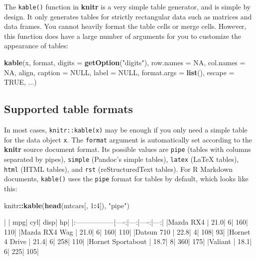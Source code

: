 \documentclass[
  11pt,
]{krantz}
\newenvironment{Shaded}{\begin{snugshade}}{\end{snugshade}}
\newcommand{\DataTypeTok}[1]{\textcolor[rgb]{0.27,0.27,0.27}{#1}}
\newcommand{\DecValTok}[1]{\textcolor[rgb]{0.06,0.06,0.06}{#1}}
\newcommand{\KeywordTok}[1]{\textcolor[rgb]{0.27,0.27,0.27}{\textbf{#1}}}
\newcommand{\NormalTok}[1]{#1}
\newcommand{\OperatorTok}[1]{\textcolor[rgb]{0.43,0.43,0.43}{\textbf{#1}}}
\newcommand{\OtherTok}[1]{\textcolor[rgb]{0.37,0.37,0.37}{#1}}
\newcommand{\StringTok}[1]{\textcolor[rgb]{0.5,0.5,0.5}{#1}}
\begin{document}
The \texttt{kable()} function in \textbf{knitr} is a very simple table generator, and is simple by design. It only generates tables for strictly rectangular data such as matrices and data frames. You cannot heavily format the table cells or merge cells. However, this function does have a large number of arguments for you to customize the appearance of tables:

\begin{Shaded}
\begin{Highlighting}[]
\KeywordTok{kable}\NormalTok{(x, format, }\DataTypeTok{digits =} \KeywordTok{getOption}\NormalTok{(}\StringTok{"digits"}\NormalTok{), }\DataTypeTok{row.names =} \OtherTok{NA}\NormalTok{, }\DataTypeTok{col.names =} \OtherTok{NA}\NormalTok{, align, }\DataTypeTok{caption =} \OtherTok{NULL}\NormalTok{, }\DataTypeTok{label =} \OtherTok{NULL}\NormalTok{, }
  \DataTypeTok{format.args =} \KeywordTok{list}\NormalTok{(), }\DataTypeTok{escape =} \OtherTok{TRUE}\NormalTok{, ...)}
\end{Highlighting}
\end{Shaded}

\hypertarget{kable-formats}{%
\subsection{Supported table formats}\label{kable-formats}}

In most cases, \texttt{knitr::kable(x)} may be enough if you only need a simple table for the data object \texttt{x}. The \texttt{format} argument is automatically set according to the \textbf{knitr} source document format. Its possible values are \texttt{pipe} (tables with columns separated by pipes), \texttt{simple} (Pandoc's simple tables), \texttt{latex} (LaTeX tables), \texttt{html} (HTML tables), and \texttt{rst} (reStructuredText tables). For R Markdown documents, \texttt{kable()} uses the \texttt{pipe} format for tables by default, which looks like this:

\begin{Shaded}
\begin{Highlighting}[]
\NormalTok{knitr}\OperatorTok{::}\KeywordTok{kable}\NormalTok{(}\KeywordTok{head}\NormalTok{(mtcars[, }\DecValTok{1}\OperatorTok{:}\DecValTok{4}\NormalTok{]), }\StringTok{"pipe"}\NormalTok{)}
\end{Highlighting}
\end{Shaded}

\begin{Shaded}
\begin{Highlighting}[]
\NormalTok{|                  |  mpg| cyl| disp|  hp|}
\NormalTok{|:-----------------|----:|---:|----:|---:|}
\NormalTok{|Mazda RX4         | 21.0|   6|  160| 110|}
\NormalTok{|Mazda RX4 Wag     | 21.0|   6|  160| 110|}
\NormalTok{|Datsun 710        | 22.8|   4|  108|  93|}
\NormalTok{|Hornet 4 Drive    | 21.4|   6|  258| 110|}
\NormalTok{|Hornet Sportabout | 18.7|   8|  360| 175|}
\NormalTok{|Valiant           | 18.1|   6|  225| 105|}
\end{Highlighting}
\end{Shaded}
\end{document}
